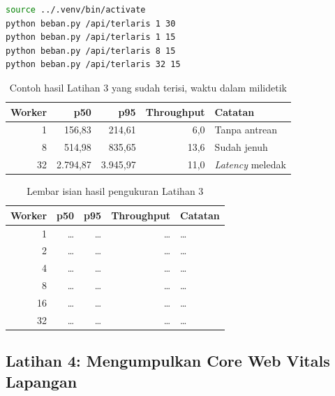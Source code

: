 \begin{lstlisting}[language=bash, caption={Menaikkan konkurensi bertahap, tersedia di \berkas{sources/chapter05/beban.py}}, label={lst:c5-lat3-jalan}]
source ../.venv/bin/activate
python beban.py /api/terlaris 1 30
python beban.py /api/terlaris 1 15
python beban.py /api/terlaris 8 15
python beban.py /api/terlaris 32 15
\end{lstlisting}

\begin{table}[!htb]
  \centering
  \caption{Contoh hasil Latihan 3 yang sudah terisi, waktu dalam milidetik}
  \label{tab:c5-lat3-contoh}
  \begin{tabularx}{\textwidth}{rrrrX}
    \hline
    \textbf{Worker} & \textbf{p50} & \textbf{p95} & \textbf{Throughput} & \textbf{Catatan} \\
    \hline
    1 & 156,83 & 214,61 & 6,0 & Tanpa antrean \\
    \hline
    8 & 514,98 & 835,65 & 13,6 & Sudah jenuh \\
    \hline
    32 & 2.794,87 & 3.945,97 & 11,0 & \textit{Latency} meledak \\
    \hline
  \end{tabularx}
\end{table}

\begin{table}[!htb]
  \centering
  \caption{Lembar isian hasil pengukuran Latihan 3}
  \label{tab:c5-lat3-hasil}
  \begin{tabularx}{\textwidth}{rrrrX}
    \hline
    \textbf{Worker} & \textbf{p50} & \textbf{p95} & \textbf{Throughput} & \textbf{Catatan} \\
    \hline
    1 & \dots & \dots & \dots & \dots \\
    \hline
    2 & \dots & \dots & \dots & \dots \\
    \hline
    4 & \dots & \dots & \dots & \dots \\
    \hline
    8 & \dots & \dots & \dots & \dots \\
    \hline
    16 & \dots & \dots & \dots & \dots \\
    \hline
    32 & \dots & \dots & \dots & \dots \\
    \hline
  \end{tabularx}
\end{table}

\subsection*{Latihan 4: Mengumpulkan Core Web Vitals Lapangan}

